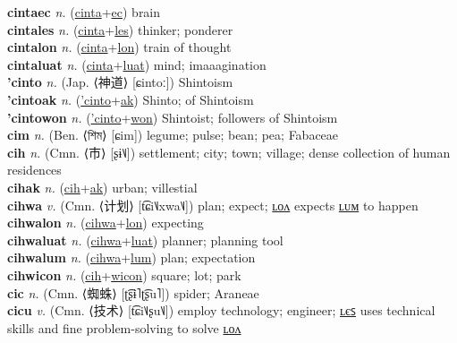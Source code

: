 \textbf{cintaec} \textit{n.} (\hyperref[cinta]{cinta}+\hyperref[ec]{ec})
brain \label{cintaec} \\
\textbf{cintales} \textit{n.} (\hyperref[cinta]{cinta}+\hyperref[les]{les})
thinker; ponderer \label{cintales} \\
\textbf{cintalon} \textit{n.} (\hyperref[cinta]{cinta}+\hyperref[lon]{lon})
train of thought \label{cintalon} \\
\textbf{cintaluat} \textit{n.} (\hyperref[cinta]{cinta}+\hyperref[luat]{luat})
mind; imaaagination \label{cintaluat} \\
\textbf{'cinto} \textit{n.} (Jap. ⟨神道⟩ [ɕintoː])
Shintoism \label{'cinto} \\
\textbf{'cintoak} \textit{n.} (\hyperref['cinto]{'cinto}+\hyperref[ak]{ak})
Shinto; of Shintoism \label{'cintoak} \\
\textbf{'cintowon} \textit{n.} (\hyperref['cinto]{'cinto}+\hyperref[won]{won})
Shintoist; followers of Shintoism \label{'cintowon} \\
\textbf{cim} \textit{n.} (Ben. ⟨শিম⟩ [ɕim])
legume; pulse; bean; pea; Fabaceae \label{cim} \\
\textbf{cih} \textit{n.} (Cmn. ⟨市⟩ [ʂɨ˥˩])
settlement; city; town; village; dense collection of human residences \label{cih} \\
\textbf{cihak} \textit{n.} (\hyperref[cih]{cih}+\hyperref[ak]{ak})
urban; villestial \label{cihak} \\
\textbf{cihwa} \textit{v.} (Cmn. ⟨计划⟩ [t͡ɕi˥˩xwa˥˩])
plan; expect; \hyperref[cihwalon]{ʟᴏᴧ} expects \hyperref[cihwalum]{ʟᴜᴍ} to happen \label{cihwa} \\
\textbf{cihwalon} \textit{n.} (\hyperref[cihwa]{cihwa}+\hyperref[lon]{lon})
expecting \label{cihwalon} \\
\textbf{cihwaluat} \textit{n.} (\hyperref[cihwa]{cihwa}+\hyperref[luat]{luat})
planner; planning tool \label{cihwaluat} \\
\textbf{cihwalum} \textit{n.} (\hyperref[cihwa]{cihwa}+\hyperref[lum]{lum})
plan; expectation \label{cihwalum} \\
\textbf{cihwicon} \textit{n.} (\hyperref[cih]{cih}+\hyperref[wicon]{wicon})
square; lot; park \label{cihwicon} \\
\textbf{cic} \textit{n.} (Cmn. ⟨蜘蛛⟩ [ʈ͡ʂɨ˥ʈ͡ʂu˥])
spider; Araneae \label{cic} \\
\textbf{cicu} \textit{v.} (Cmn. ⟨技术⟩ [t͡ɕi˥˩ʂu˥˩])
employ technology; engineer; \hyperref[cicules]{ʟєꜱ} uses technical skills and fine problem-solving to solve \hyperref[ciculon]{ʟᴏᴧ} \label{cicu} \\
